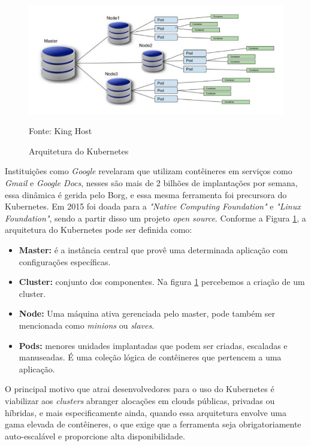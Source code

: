 \begin{figure}[htb]
	\centering
	\includegraphics[width=1\linewidth]{imagens/kubernetes}
	\caption{Arquitetura do Kubernetes}
	Fonte: King Host\footnotemark
	\label{fig:kubernetes}
\end{figure}

Instituições como \textit{Google} revelaram que utilizam  contêineres em serviços como \textit{Gmail} e \textit{Google Docs}, nesses são mais de 2 bilhões de implantações por semana, essa dinâmica é gerida pelo Borg, e essa mesma ferramenta foi precursora do Kubernetes. Em 2015 foi doada para a \textit{"Native Computing Foundation"} e \textit{"Linux Foundation"}, sendo a partir disso um projeto\textit{ open source}.\cite{trucco}
\newpage
Conforme a Figura \ref{fig:kubernetes}, a arquitetura do Kubernetes pode ser definida como:
\begin{itemize}
\item \textbf{Master:} é a instância central que provê uma determinada aplicação com configurações específicas.
\item \textbf{Cluster: }conjunto dos componentes. Na figura \ref{fig:kubernetes} percebemos a criação de um cluster.
\item \textbf{Node:} Uma máquina ativa gerenciada pelo master, pode também ser mencionada como \textit{minions} ou \textit{slaves}.
\item \textbf{Pods:} menores unidades implantadas que podem ser criadas, escaladas e manuseadas. É uma coleção lógica de contêineres que pertencem a uma aplicação.
\end{itemize}

O principal motivo que atrai desenvolvedores para o uso do Kubernetes é viabilizar aos \textit{clusters} abranger alocações em clouds públicas, privadas ou híbridas, e mais especificamente ainda, quando essa arquitetura envolve uma gama elevada de contêineres, o que exige que a ferramenta seja obrigatoriamente auto-escalável e proporcione alta disponibilidade.\cite{netto2016replicaccao}

